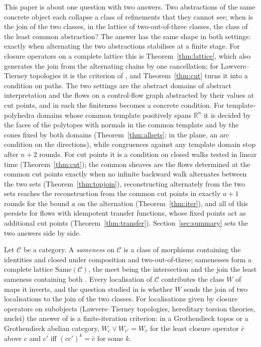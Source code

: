 \documentclass[11pt]{amsart}
\theoremstyle{definition}
\newcommand{\Same}{\mathrm{Same}}
\begin{document}
This paper is about one question with two answers. Two abstractions
of the same concrete object each collapse a class of refinements that
they cannot see; when is the join of the two classes, in the lattice of
two-out-of-three classes, the class of the least common abstraction? The
answer has the same shape in both settings: exactly when alternating the
two abstractions stabilises at a finite stage. For closure operators on
a complete lattice this is Theorem~\ref{thm:lattice}, which also
generates the join from the alternating chains by one cancellation; for
Lawvere--Tierney topologies it is the criterion of \cite{Fijoin}, and
Theorem~\ref{thm:cut} turns it into a condition on paths. The two
settings are the abstract domains of abstract interpretation and the
flows on a control-flow graph abstracted by their values at cut points,
and in each the finiteness becomes a concrete condition. For
template-polyhedra domains whose common template positively spans
$\mathbb R^n$ it is decided by the faces of the polytopes with normals
in the common template and by the cones fixed by both domains
(Theorem~\ref{thm:allsets}; in the plane, an arc condition on the
directions), while congruences against any template domain stop after
$n+2$ rounds. For cut points it is a condition on
closed walks tested in linear time (Theorem~\ref{thm:cut}); the common
sheaves are the flows determined at the common cut points exactly when
no infinite backward walk alternates between the two sets
(Theorem~\ref{thm:topjoin}), reconstructing alternately from the two
sets reaches the reconstruction from the common cut points in exactly
$a+1$ rounds for the bound $a$ on the alternation
(Theorem~\ref{thm:iter}), and all of this persists for flows with
idempotent transfer functions, whose fixed points act as additional cut
points (Theorem~\ref{thm:transfer}). Section~\ref{sec:summary} sets the
two answers side by side.

Let $\mathcal C$ be a category. A \emph{sameness} on $\mathcal C$ is a
class of morphisms containing the identities and closed under composition
and two-out-of-three; samenesses form a complete lattice $\Same(\mathcal
C)$, the meet being the intersection and the join the least sameness
containing both \cite{Same}. Every localisation of $\mathcal C$
contributes the class $W$ of maps it inverts, and the question studied in
\cite{Topjoin,Finitejoin,Stabjoin,Fijoin} is whether $W$ sends the join
of two localisations to the join of the two classes. For localisations
given by closure operators on subobjects (Lawvere--Tierney topologies,
hereditary torsion theories, nuclei) the answer of \cite{Fijoin} is a
finite-iteration criterion: in a Grothendieck topos or a Grothendieck
abelian category, $W_c\vee W_{c'}=W_{\bar c}$ for the least closure
operator $\bar c$ above $c$ and $c'$ iff $(cc')^k=\bar c$ for some $k$.
\end{document}
